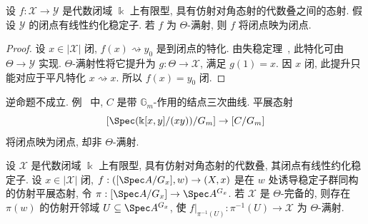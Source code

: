 \begin{proposition}\label{src:7.10.11}
设 $f:\mathcal X\to\mathcal Y$ 是代数闭域 $\Bbbk$ 上有限型, 具有仿射对角态射的代数叠之间的态射. 假设 $\mathcal Y$ 的闭点有线性约化稳定子. 若 $f$ 为 $\Theta$-满射, 则 $f$ 将闭点映为闭点.
\end{proposition}
\begin{proof}
设 $x\in|\mathcal X|$ 闭, $f(x)\rightsquigarrow y_0$ 是到闭点的特化. 由失稳定理~, 此特化可由 $\Theta\to\mathcal Y$ 实现. $\Theta$-满射性将它提升为 $g:\Theta\to\mathcal X$, 满足 $g(1)=x$. 因 $x$ 闭, 此提升只能对应于平凡特化 $x\rightsquigarrow x$. 所以 $f(x)=y_0$ 闭.
\end{proof}
\begin{remark}\label{src:7.10.12}
逆命题不成立. 例~ 中, $C$ 是带 $\mathbb G_m$-作用的结点三次曲线. 平展态射
\[[\Spec(\Bbbk[x,y]/(xy))/\mathbb G_m]\to[C/\mathbb G_m]\]
将闭点映为闭点, 却非 $\Theta$-满射.
\end{remark}
\begin{proposition}\label{src:7.10.13}
设 $\mathcal X$ 是代数闭域 $\Bbbk$ 上有限型, 具有仿射对角态射的代数叠, 其闭点有线性约化稳定子. 设 $x\in|\mathcal X|$ 闭, $f:([\Spec A/G_x],w)\to(\mathcal X,x)$ 是在 $w$ 处诱导稳定子群同构的仿射平展态射, 令 $\pi:[\Spec A/G_x]\to\Spec A^{G_x}$. 若 $\mathcal X$ 是 $\Theta$-完备的, 则存在 $\pi(w)$ 的仿射开邻域 $U\subseteq\Spec A^{G_x}$, 使 $f|_{\pi^{-1}(U)}:\pi^{-1}(U)\to\mathcal X$ 为 $\Theta$-满射.
\end{proposition}
